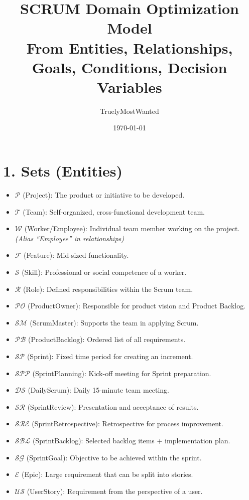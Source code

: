 \documentclass[11pt,a4paper]{article}
\title{SCRUM Domain Optimization Model\\\large From Entities, Relationships, Goals, Conditions, Decision Variables}
\author{TruelyMostWanted}
\date{\today}
\begin{document}
\maketitle
\tableofcontents
\newpage

\section{1. Sets (Entities)}
\begin{itemize}
  \item $\mathcal{P}$ (Project): The product or initiative to be developed.
  \item $\mathcal{T}$ (Team): Self-organized, cross-functional development team.
  \item $\mathcal{W}$ (Worker/Employee): Individual team member working on the project. \emph{(Alias ``Employee'' in relationships)}
  \item $\mathcal{F}$ (Feature): Mid-sized functionality.
  \item $\mathcal{S}$ (Skill): Professional or social competence of a worker.
  \item $\mathcal{R}$ (Role): Defined responsibilities within the Scrum team.
  \item $\mathcal{PO}$ (ProductOwner): Responsible for product vision and Product Backlog.
  \item $\mathcal{SM}$ (ScrumMaster): Supports the team in applying Scrum.
  \item $\mathcal{PB}$ (ProductBacklog): Ordered list of all requirements.
  \item $\mathcal{SP}$ (Sprint): Fixed time period for creating an increment.
  \item $\mathcal{SPP}$ (SprintPlanning): Kick-off meeting for Sprint preparation.
  \item $\mathcal{DS}$ (DailyScrum): Daily 15-minute team meeting.
  \item $\mathcal{SR}$ (SprintReview): Presentation and acceptance of results.
  \item $\mathcal{SRE}$ (SprintRetrospective): Retrospective for process improvement.
  \item $\mathcal{SBL}$ (SprintBacklog): Selected backlog items + implementation plan.
  \item $\mathcal{SG}$ (SprintGoal): Objective to be achieved within the sprint.
  \item $\mathcal{E}$ (Epic): Large requirement that can be split into stories.
  \item $\mathcal{US}$ (UserStory): Requirement from the perspective of a user.

\end{itemize}
\end{document}
